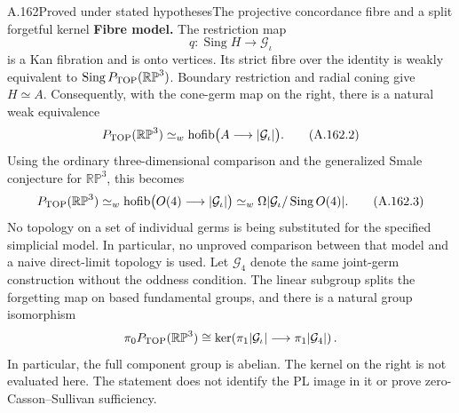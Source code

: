 \begin{saresult}{A.162}{Proved under stated hypotheses}{The projective concordance fibre and a split forgetful kernel}
\textbf{Fibre model.}\quad
The restriction map
\[
 q:\operatorname{Sing}H\longrightarrow\mathcal G_{\iota}
 \tag{A.162.1}
\]
is a Kan fibration and is onto vertices. Its strict fibre over the identity
is weakly equivalent to $\operatorname{Sing}P_{\rm TOP}(\mathbb {RP}^3)$.
Boundary restriction and radial coning give $H\simeq A$. Consequently,
with the cone-germ map on the right, there is a natural weak equivalence
\[
 P_{\rm TOP}(\mathbb {RP}^3)
 \simeq_w\operatorname{hofib}\bigl(A\longrightarrow|\mathcal G_{\iota}|\bigr).
 \tag{A.162.2}
\]
Using the ordinary three-dimensional comparison and the generalized
Smale conjecture for $\mathbb {RP}^3$, this becomes
\[
 P_{\rm TOP}(\mathbb {RP}^3)
 \simeq_w\operatorname{hofib}\bigl(O(4)\longrightarrow|\mathcal G_{\iota}|\bigr)
 \simeq_w\Omega|\mathcal G_{\iota}/\operatorname{Sing}O(4)|.
 \tag{A.162.3}
\]
No topology on a set of individual germs is being substituted for the
specified simplicial model. In particular, no unproved comparison between
that model and a naive direct-limit topology is used. Let $\mathcal G_4$ denote the same joint-germ construction without the
oddness condition. The linear subgroup splits the forgetting map on
based fundamental groups, and there is a natural group isomorphism
\[
 \pi_0P_{\rm TOP}(\mathbb {RP}^3)
 \cong
 \ker\!\left(\pi_1|\mathcal G_\iota|
                 \longrightarrow\pi_1|\mathcal G_4|\right).
\]
In particular, the full component group is abelian. The kernel on the
right is not evaluated here. The statement does not identify the PL
image in it or prove zero-Casson--Sullivan sufficiency.
\end{saresult}

